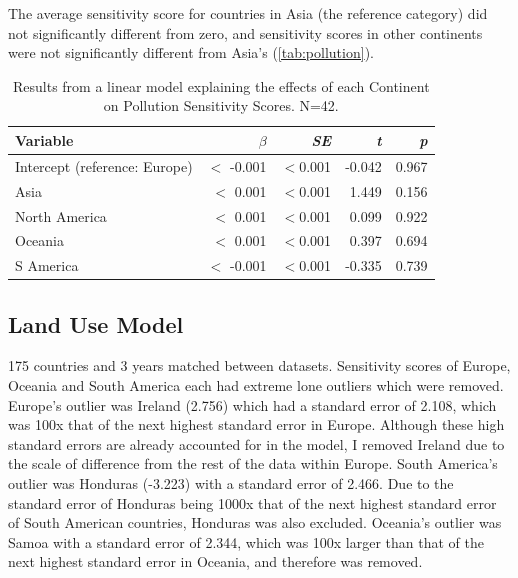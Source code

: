 \documentclass[11pt, a4paper, titlepage]{article}
\begin{document}
\newpage
	The average sensitivity score for countries in Asia (the reference category) did not significantly different from zero, and sensitivity scores in other continents were not significantly different from Asia's (\autoref{tab:pollution}).
	
		\begin{table}[H]
		\begin{center}
			\caption{Results from a linear model explaining the effects of each Continent on Pollution Sensitivity Scores. \textmd{ N=42.}}
			\label{tab:pollution}
			\begin{tabular}{l|r|r|r|r} %
				Variable & $\beta$ & \textit{SE} & \textit{t} & \textit{p}\\
				\hline
				Intercept (reference: Europe) & $<$ -0.001 & $<$0.001 & -0.042 & 0.967\\
				Asia & $<$ 0.001 & $<$0.001 & 1.449 & 0.156 \\
				North America & $<$ 0.001 & $<$0.001 & 0.099 & 0.922\\
				Oceania & $<$ 0.001 & $<$0.001 & 0.397 & 0.694\\
				S America & $<$ -0.001 & $<$0.001 & -0.335 & 0.739\\
			\end{tabular}
		\end{center}
	\end{table}

\bigskip
	\subsection*{Land Use Model}
	
	175 countries and 3 years matched between datasets. Sensitivity scores of Europe, Oceania and South America each had extreme lone outliers which were removed. Europe's outlier was Ireland (2.756) which had a standard error of 2.108, which was 100x that of the next highest standard error in Europe. Although these high standard errors are already accounted for in the model, I removed Ireland due to the scale of difference from the rest of the data within Europe. South America's outlier was Honduras (-3.223) with a standard error of 2.466. Due to the standard error of Honduras being 1000x that of the next highest standard error of South American countries, Honduras was also excluded. Oceania's outlier was Samoa with a standard error of 2.344, which was 100x larger than that of the next highest standard error in Oceania, and therefore was removed.
	
\end{document}

